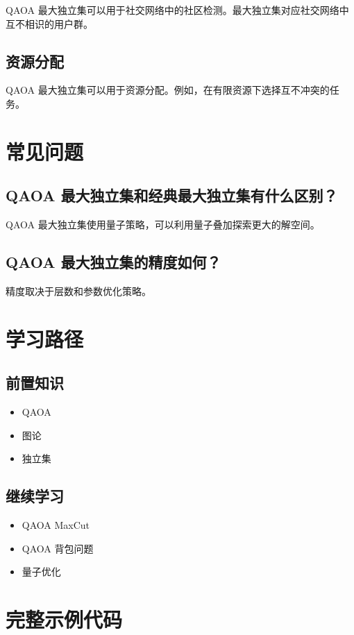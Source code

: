 \documentclass[12pt,a4paper]{article}
\begin{document}
QAOA 最大独立集可以用于社交网络中的社区检测。最大独立集对应社交网络中互不相识的用户群。

\subsection{资源分配}

QAOA 最大独立集可以用于资源分配。例如，在有限资源下选择互不冲突的任务。

\section{常见问题}

\subsection{QAOA 最大独立集和经典最大独立集有什么区别？}

QAOA 最大独立集使用量子策略，可以利用量子叠加探索更大的解空间。

\subsection{QAOA 最大独立集的精度如何？}

精度取决于层数和参数优化策略。

\section{学习路径}

\subsection{前置知识}
\begin{itemize}
  \item QAOA
  \item 图论
  \item 独立集
\end{itemize}

\subsection{继续学习}
\begin{itemize}
  \item QAOA MaxCut
  \item QAOA 背包问题
  \item 量子优化
\end{itemize}

\section{完整示例代码}
\end{document}
